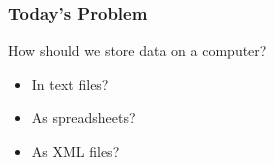 \documentclass[dvipsnames,handout]{beamer}
\begin{document}



\begin{frame} \frametitle{Today's Problem}
  \begin{Large}
    How should we store data on a computer?
  \end{Large}

  \begin{itemize}
  \item In text files?
  \item As spreadsheets?
  \item As XML files?
  \end{itemize}
\end{frame}
\end{document}
